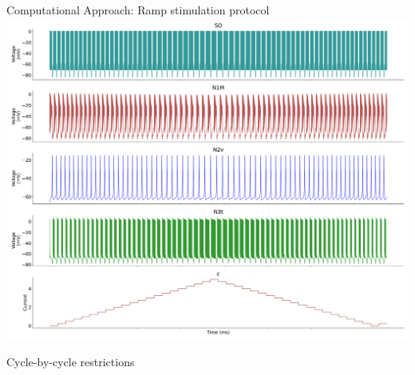 \documentclass[aspectratio=43]{beamer}
\begin{document}
\begin{frame}{Computational Approach: Ramp stimulation protocol}
	\includegraphics[width=\textwidth]{methods-paper-modelo/circuit_w_current.pdf}
\end{frame}

\begin{frame}{Cycle-by-cycle restrictions}
\end{frame}
\end{document}
